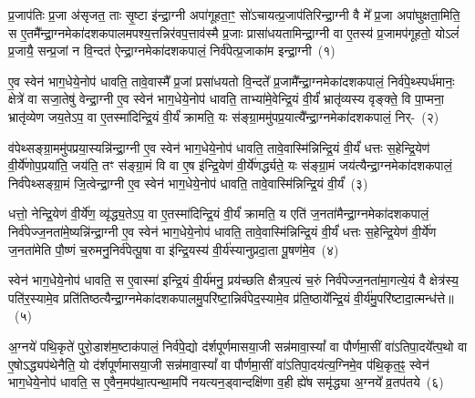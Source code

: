 \setcounter{anuvakam}{0}
प्र॒जा\-प॑तिः प्र॒जा अ॑सृजत॒ ताः सृ॒ष्टा इ॑न्द्रा॒ग्नी अपा॑गूहता॒ꣳ॒ सो॑\-ऽचायत्प्र॒जा\-प॑तिरिन्द्रा॒ग्नी वै मे᳚ प्र॒जा अपा॑घुक्षता॒मिति॒ स ए॒तमै᳚न्द्रा॒ग्नमेका॑\-दश\-कपालमपश्य॒त्तन्निर॑वप॒त्ताव॑स्मै प्र॒जाः प्रासा॑धयतामिन्द्रा॒ग्नी वा ए॒तस्य॑ प्र॒जामप॑गूहतो॒ यो\-ऽलं॑ प्र॒जायै॒ सन्प्र॒जां न वि॒न्दत॑ ऐन्द्रा॒ग्नमेका॑\-दश\-कपालं॒ निर्व॑पेत्प्र॒जाका॑म इन्द्रा॒ग्नी~(१)

ए॒व स्वेन॑ भाग॒धेये॒नोप॑ धावति॒ तावे॒वास्मै᳚ प्र॒जां प्रसा॑धयतो वि॒न्दते᳚ प्र॒जामै᳚न्द्रा॒ग्नमेका॑\-दश\-कपालं॒ निर्व॑पे॒थ्स्पर्ध॑मानः॒ क्षेत्रे॑ वा सजा॒तेषु॑ वेन्द्रा॒ग्नी ए॒व स्वेन॑ भाग॒धेये॒नोप॑ धावति॒ ताभ्या॑मे॒वेन्द्रि॒यं वी॒र्यं॑ भ्रातृ॑व्यस्य वृङ्क्ते॒ वि पा॒प्मना॒ भ्रातृ॑व्येण जय॒ते\-ऽप॒ वा ए॒तस्मा॑दिन्द्रि॒यं वी॒र्यं॑ क्रामति॒ यः स॑ङ्ग्रा॒ममु॑पप्र॒यात्यै᳚न्द्रा॒ग्नमेका॑\-दश\-कपालं॒ निर्-~(२)

व॑पेथ्सङ्ग्रा॒ममु॑पप्रया॒स्यन्नि॑न्द्रा॒ग्नी ए॒व स्वेन॑ भाग॒धेये॒नोप॑ धावति॒ तावे॒वास्मि॑न्निन्द्रि॒यं वी॒र्यं॑ धत्तः स॒हेन्द्रि॒येण॑ वी॒र्ये॑णोप॒प्रया॑ति॒ जय॑ति॒ तꣳ स॑ङ्ग्रा॒मं वि वा ए॒ष इ॑न्द्रि॒येण॑ वी॒र्ये॑णर्द्ध्यते॒ यः स॑ङ्ग्रा॒मं जय॑त्यैन्द्रा॒ग्नमेका॑\-दश\-कपालं॒ निर्व॑पेथ्सङ्ग्रा॒मं जि॒त्वेन्द्रा॒ग्नी ए॒व स्वेन॑ भाग॒धेये॒नोप॑ धावति॒ तावे॒वास्मि॑न्निन्द्रि॒यं वी॒र्यं॑~(३)

धत्तो॒ नेन्द्रि॒येण॑ वी॒र्ये॑ण॒ व्यृ॑द्ध्य॒ते\-ऽप॒ वा ए॒तस्मा॑दिन्द्रि॒यं वी॒र्यं॑ क्रामति॒ य एति॑ ज॒नता॑मैन्द्रा॒ग्नमेका॑\-दश\-कपालं॒ निर्व॑पेज्ज॒नता॑\-मे॒ष्यन्नि॑न्द्रा॒ग्नी ए॒व स्वेन॑ भाग॒धेये॒नोप॑ धावति॒ तावे॒वास्मि॑न्निन्द्रि॒यं वी॒र्यं॑ धत्तः स॒हेन्द्रि॒येण॑ वी॒र्ये॑ण ज॒नता॑मेति पौ॒ष्णं च॒रुमनु॒निर्व॑पेत्पू॒षा वा इ॑न्द्रि॒यस्य॑ वी॒र्य॑स्यानुप्रदा॒ता पू॒षण॑मे॒व~(४)

स्वेन॑ भाग॒धेये॒नोप॑ धावति॒ स ए॒वास्मा॑ इन्द्रि॒यं वी॒र्य॑मनु॒ प्रय॑च्छति क्षैत्रप॒त्यं च॒रुं निर्व॑पेज्ज॒नता॑मा॒गत्ये॒यं वै क्षेत्र॑स्य॒ पति॑र॒स्यामे॒व प्रति॑तिष्ठत्यैन्द्रा॒ग्नमेका॑\-दश\-कपालमु॒परि॑ष्टा॒\-न्निर्व॑पेद॒स्यामे॒व प्र॑ति॒ष्ठाये᳚न्द्रि॒यं वी॒र्य॑मु॒परि॑ष्टादा॒त्मन्ध॑त्ते॥~(५)

{\anuvakamend[{प्र॒जाका॑म इन्द्रा॒ग्नी उ॑पप्र॒यात्यै᳚न्द्रा॒ग्नमेका॑\-दश\-कपालं॒ निर्वी॒र्यं॑ पू॒षण॑मे॒वैका॒न्नच॑त्वारि॒ꣳ॒शच्च॑}]}

अ॒ग्नये॑ पथि॒कृते॑ पुरो॒डाश॑\-म॒ष्टा\-क॑पालं॒ निर्व॑पे॒द्यो द॑र्\mbox{}शपूर्णमास\-या॒जी सन्न॑मावा॒स्यां᳚ वा पौर्णमा॒सीं वा॑\-ऽतिपा॒दये᳚त्प॒थो वा ए॒षो\-ऽद्ध्यप॑थेनैति॒ यो द॑र्\mbox{}शपूर्णमासया॒जी सन्न॑मावा॒स्यां᳚ वा पौर्णमा॒सीं वा॑\-ऽतिपा॒दय॑त्य॒ग्निमे॒व प॑थि॒कृत॒ꣴ॒ स्वेन॑ भाग॒धेये॒नोप॑ धावति॒ स ए॒वैन॒मप॑था॒त्पन्था॒मपि॑ नयत्यन॒ड्वान्दक्षि॑णा व॒ही ह्ये॑ष समृ॑द्ध्या अ॒ग्नये᳚ व्र॒तप॑तये~(६)

